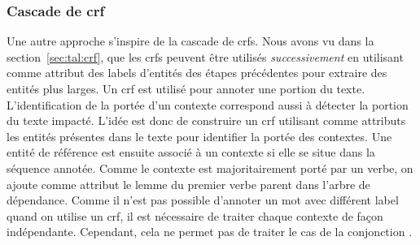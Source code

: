 \subsubsection{Cascade de \gls*{crf}}
\label{sec:tal:ctx:crf}

Une autre approche s'inspire de la cascade de \glspl{crf}.
Nous avons vu dans la section~\ref{sec:tal:crf}, que les \glspl{crf} peuvent être utilisés \emph{successivement} en utilisant comme attribut des labels d'entités des étapes précédentes pour extraire des entités plus larges.
Un \gls{crf} est utilisé pour annoter une portion du texte.
L'identification de la portée d'un contexte correspond aussi à détecter la portion du texte impacté.
L'idée est donc de construire un \gls{crf} utilisant comme attributs les entités présentes dans le texte pour identifier la portée des contextes.
Une entité de référence est ensuite associé à un contexte si elle se situe dans la séquence annotée.
Comme le contexte est majoritairement porté par un verbe, on ajoute comme attribut le lemme du premier verbe parent dans l'arbre de dépendance.
Comme il n'est pas possible d'annoter un mot avec différent label quand on utilise un \gls{crf}, il est nécessaire de traiter chaque contexte de façon indépendante.
Cependant, cela ne permet pas de traiter le cas de la conjonction .
